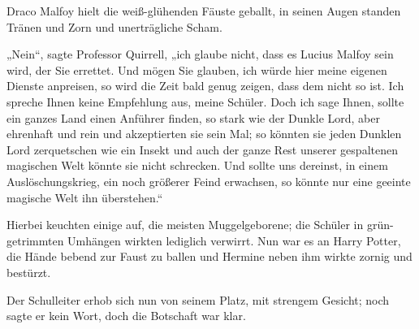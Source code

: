 Draco Malfoy hielt die weiß-glühenden Fäuste geballt, in seinen Augen standen Tränen und Zorn und unerträgliche Scham.

„Nein“, sagte Professor Quirrell, „ich glaube nicht, dass es Lucius Malfoy sein wird, der Sie errettet. Und mögen Sie glauben, ich würde hier meine eigenen Dienste anpreisen, so wird die Zeit bald genug zeigen, dass dem nicht so ist. Ich spreche Ihnen keine Empfehlung aus, meine Schüler. Doch ich sage Ihnen, sollte ein ganzes Land einen Anführer finden, so stark wie der Dunkle Lord, aber ehrenhaft und rein und akzeptierten sie sein Mal; so könnten sie jeden Dunklen Lord zerquetschen wie ein Insekt und auch der ganze Rest unserer gespaltenen magischen Welt könnte sie nicht schrecken. Und sollte uns dereinst, in einem Auslöschungskrieg, ein noch größerer Feind erwachsen, so könnte nur eine geeinte magische Welt ihn überstehen.“

Hierbei keuchten einige auf, die meisten Muggelgeborene; die Schüler in grün-getrimmten Umhängen wirkten lediglich verwirrt. Nun war es an Harry Potter, die Hände bebend zur Faust zu ballen und Hermine neben ihm wirkte zornig und bestürzt.

Der Schulleiter erhob sich nun von seinem Platz, mit strengem Gesicht; noch sagte er kein Wort, doch die Botschaft war klar.

